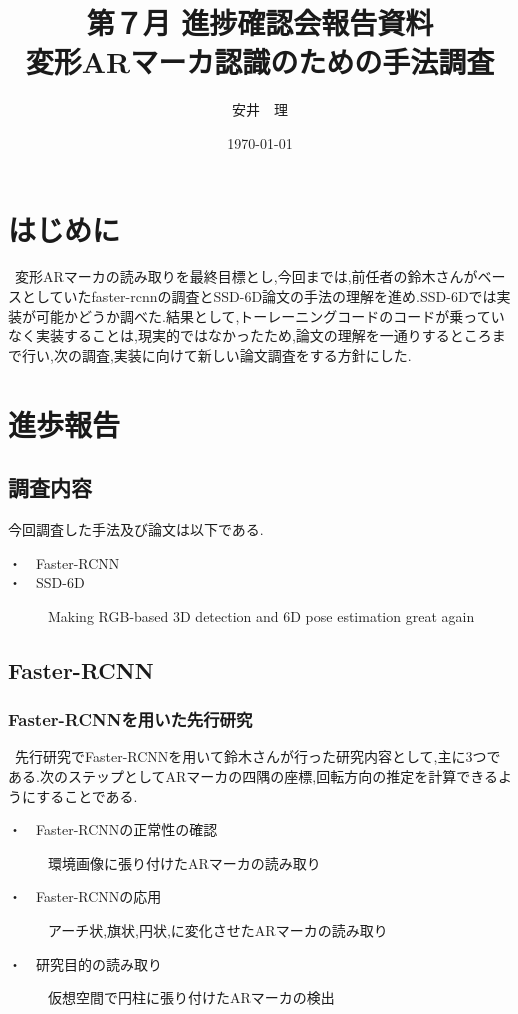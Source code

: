 \documentclass[11pt,a4j,ascmac]{jarticle}
\title{第７月 進捗確認会報告資料\\
変形ARマーカ認識のための手法調査}
\author{安井　理}
\date{\today}
\begin{document}
\maketitle
\section{はじめに}

\ 変形ARマーカの読み取りを最終目標とし,今回までは,前任者の鈴木さんがベースとしていたfaster-rcnnの調査とSSD-6D論文の手法の理解を進め.SSD-6Dでは実装が可能かどうか調べた.結果として,トーレーニングコードのコードが乗っていなく実装することは,現実的ではなかったため,論文の理解を一通りするところまで行い,次の調査,実装に向けて新しい論文調査をする方針にした.\ 

\section{進歩報告}

\subsection{調査内容}

今回調査した手法及び論文は以下である.

\begin{description}
    \item[・　Faster-RCNN]
    \item[・　SSD-6D]Making RGB-based 3D detection and 6D pose estimation great again
\end{description}


\subsection{Faster-RCNN}

\subsubsection{Faster-RCNNを用いた先行研究}

\  先行研究でFaster-RCNNを用いて鈴木さんが行った研究内容として,主に3つである.次のステップとしてARマーカの四隅の座標,回転方向の推定を計算できるようにすることである.

\begin{description}
    \item[・　Faster-RCNNの正常性の確認]環境画像に張り付けたARマーカの読み取り
    \item[・　Faster-RCNNの応用]アーチ状,旗状,円状,に変化させたARマーカの読み取り
    \item[・　研究目的の読み取り]仮想空間で円柱に張り付けたARマーカの検出
\end{description}
\end{document}
